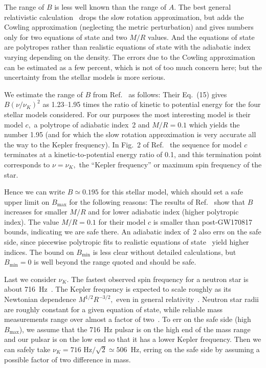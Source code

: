 \documentclass{ttuthes2007}
\begin{document}
The range of $B$ is less well known than the range of $A.$
The best general relativistic calculation~\cite{Yoshida:2004gk} drops the slow
rotation approximation, but adds the Cowling approximation (neglecting the
metric perturbation) and gives numbers only for two equations of state and two
$M/R$ values.
And the equations of state are polytropes rather than realistic equations of
state with the adiabatic index varying depending on the density.
The errors due to the Cowling approximation can be estimated as a few percent,
which is not of too much concern here; but the uncertainty from the stellar
models is more serious.

We estimate the range of $B$ from Ref.~\cite{Yoshida:2004gk} as follows:
Their Eq.~(15) gives $B\left( \nu/\nu_K \right)^2$ as 1.23--1.95 times the
ratio of kinetic to potential energy for the four stellar models considered.
For our purposes the most interesting model is their model $c,$ a polytrope of
adiabatic index~2 and $M/R=0.1$ which yields the number 1.95 (and for which
the slow rotation approximation is very accurate all the way to the Kepler
frequency).
In Fig.~2 of Ref.~\cite{Yoshida:2004gk} the sequence for model $c$ terminates
at a kinetic-to-potential energy ratio of 0.1, and this termination point
corresponds to $\nu=\nu_K,$ the ``Kepler frequency'' or maximum spin frequency
of the star.

Hence we can write $B \simeq 0.195$ for this stellar model, which should set a
safe upper limit on $B_{\max}$ for the following reasons:
The results of Ref.~\cite{Yoshida:2004gk} show that $B$ increases for smaller
$M/R$ and for lower adiabatic index (higher polytropic index).
The value $M/R=0.1$ for their model $c$ is smaller than post-GW170817 bounds,
indicating we are safe there.
An adiabatic index of~2 also errs on the safe side, since piecewise polytropic
fits to realistic equations of state~\cite{Read:2008iy} yield higher indices.
The bound on $B_{\min}$ is less clear without detailed calculations, but
$B_{\min}=0$ is well beyond the range quoted and should be safe.

Last we consider $\nu_K.$
The fastest observed spin frequency for a neutron star is about
716~Hz~\cite[and references therein]{Paschalidis:2016vmz}.
The Kepler frequency is expected to scale roughly as its Newtonian dependence
$M^{1/2} R^{-3/2},$ even in general relativity~\cite[and references
therein]{Paschalidis:2016vmz}.
Neutron star radii are roughly constant for a given equation of state, while
reliable mass measurements range over almost a factor of
two~\cite[and references therein]{Ozel:2016oaf}.
To err on the safe side (high $B_{\max}$), we assume that the 716~Hz pulsar is
on the high end of the mass range and our pulsar is on the low end so that it
has a lower Kepler frequency.
Then we can safely take $\nu_K = \mbox{716 Hz}/\sqrt{2} \simeq 506$~Hz, erring
on the safe side by assuming a possible factor of two difference in mass.
\end{document}
